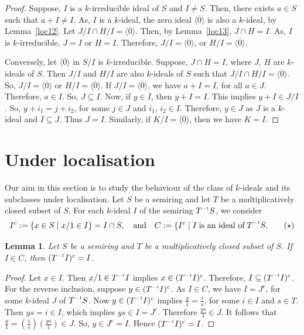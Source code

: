 \documentclass[11pt,english]{amsart}
\newcommand{\inv}{^{\raisebox{.2ex}{$\scriptscriptstyle-1$}}}
\newtheorem{lemma}[theorem]{Lemma}
\theoremstyle{definition}
\numberwithin{equation}{section}
\begin{document}
\begin{proof}
    Suppose, $I$ is a $k$-irreducible ideal of $S$ and $I\neq S$. Then, there exists $a \in S$ such that $a+I\neq I$. As, $I$ is a $k$-ideal, the zero ideal $\langle \overline{0}\rangle$ is also a $k$-ideal, by Lemma~\ref{loc12}. Let $J/I \cap H/I = \langle \overline{0}\rangle$. Then, by Lemma~\ref{loc13}, $J\cap H =I$. As, $I$ is $k$-irreducible, $J=I$ or $H=I$. Therefore, $J/I=\langle \overline{0}\rangle$, or $H/I = \langle \overline{0}\rangle$.
    
Conversely, let $\langle \overline{0}\rangle$ in $S/I$ is $k$-irreducible. Suppose, $J \cap H =I$, where $J$, $H$ are $k$-ideals of $S$. Then $J/I$ and $H/I$ are also $k$-ideals of $S$ such that $J/I \cap H/I = \langle \overline{0}\rangle$. So, $J/I = \langle \overline{0}\rangle$ or $H/I=\langle \overline{0}\rangle$. If $J/I=\langle \overline{0}\rangle$, we have  $a+I=I$, for all $a \in J$. Therefore, $a \in I$. So, $J \subseteq I$. Now, if $y \in I$, then $y+I=I$. This implies $y+I \in J/I$. So, $y+i_1 = j+i_2$, for some $j \in J$ and $i_1$, $i_2 \in I$. Therefore, $y \in J$ as $J$ is a $k$-ideal and $I \subseteq J$. Thus $J=I$. Similarly, if $K/I = \langle \overline{0}\rangle$, then we have $K=I$. 
\end{proof}

\smallskip
\section{Under localisation}\label{Section 5: k-ideals under localisation}

Our aim in this section is to study the behaviour of the class of $k$-ideals and its subclasses under localisation. 
Let $S$ be a semiring and let $T$ be a multiplicatively closed subset of $S$. For each $k$-ideal $I$
of the semiring $T\inv{S}$, we consider
\begin{equation}
    I^c:= \{x \in S \mid x/1 \in I \} = I \cap S,\quad
\text{and}\quad  C:= \{I^c \mid I \;\text{is an ideal of}\; T\inv S. \tag{$\star$}\label{Equation of C}
\end{equation}

\begin{lemma}
    Let $S$ be a semiring and $T$ be a multiplicatively closed subset of $S$. If $I \in C$, then $(T\inv I)^c =I$.
\end{lemma}

\begin{proof}
    Let $x\in I$. Then $x/1 \in T\inv I$ implies $x \in (T\inv I)^c$. Therefore, $I \subseteq (T\inv I)^c$.
For the reverse inclusion, suppose $y \in (T\inv I)^c$. As $I \in C$, we have $I=J^c$, for some $k$-ideal $J$ of $T\inv S$. Now $y \in (T\inv I)^c $ implies $\frac{y}{1}=\frac{i}{s}$, for some $i\in I$ and $s\in T$. Then $ys=i \in I$, which implies $ys \in I=J^c$. Therefore $\frac{ys}{1} \in J$. It follows that $\frac{y}{1}=(\frac{1}{s})(\frac{ys}{1})\in J$. So, $y \in J^c=I$. Hence $(T\inv I)^c=I$. 
\end{proof}
\end{document}
